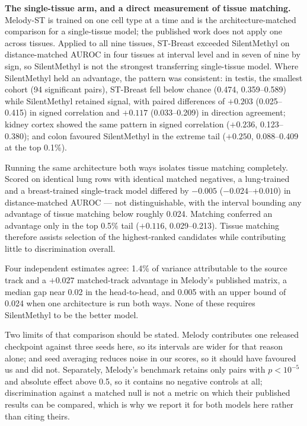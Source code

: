 \documentclass[10pt,letterpaper,twocolumn]{article}
\begin{document}
\textbf{The single-tissue arm, and a direct measurement of tissue matching.}
Melody-ST is trained on one cell type at a time and is the architecture-matched
comparison for a single-tissue model; the published work does not apply one
across tissues. Applied to all nine tissues, ST-Breast exceeded SilentMethyl on
distance-matched AUROC in four tissues at interval level and in seven of nine by
sign, so SilentMethyl is not the strongest transferring single-tissue model.
Where SilentMethyl held an advantage, the pattern was consistent: in testis, the
smallest cohort (94 significant pairs), ST-Breast fell below chance (0.474,
0.359--0.589) while SilentMethyl retained signal, with paired differences of
$+0.203$ (0.025--0.415) in signed correlation and $+0.117$ (0.033--0.209) in
direction agreement; kidney cortex showed the same pattern in signed correlation
($+0.236$, 0.123--0.380); and colon favoured SilentMethyl in the extreme tail
($+0.250$, 0.088--0.409 at the top 0.1\%).

Running the same architecture both ways isolates tissue matching completely.
Scored on identical lung rows with identical matched negatives, a lung-trained
and a breast-trained single-track model differed by $-0.005$
($-0.024$--$+0.010$) in distance-matched AUROC --- not distinguishable, with the
interval bounding any advantage of tissue matching below roughly 0.024. Matching
conferred an advantage only in the top 0.5\% tail ($+0.116$, 0.029--0.213).
Tissue matching therefore assists selection of the highest-ranked candidates
while contributing little to discrimination overall.

Four independent estimates agree: 1.4\% of variance attributable to the source
track and a $+0.027$ matched-track advantage in Melody's published matrix, a
median gap near 0.02 in the head-to-head, and 0.005 with an upper bound of 0.024
when one architecture is run both ways. None of these requires SilentMethyl to be
the better model.

Two limits of that comparison should be stated. Melody contributes one released
checkpoint against three seeds here, so its intervals are wider for that reason
alone; and seed averaging reduces noise in our scores, so it should have
favoured us and did not. Separately, Melody's benchmark retains only pairs with
$p<10^{-5}$ and absolute effect above 0.5, so it contains no negative controls
at all; discrimination against a matched null is not a metric on which their
published results can be compared, which is why we report it for both models
here rather than citing theirs.
\end{document}
